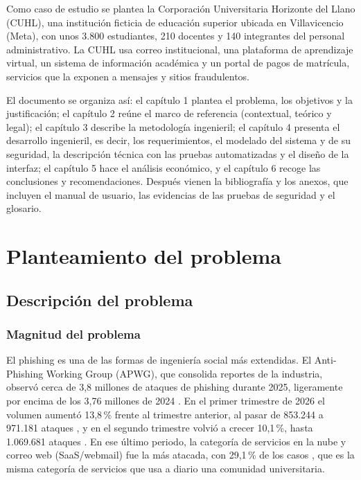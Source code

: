 \documentclass[journal,onecolumn,12pt,draftclsnofoot]{IEEEtran}
\begin{document}
Como caso de estudio se plantea la Corporación Universitaria Horizonte del Llano (CUHL), una institución ficticia de educación superior ubicada en Villavicencio (Meta), con unos 3.800 estudiantes, 210 docentes y 140 integrantes del personal administrativo. La CUHL usa correo institucional, una plataforma de aprendizaje virtual, un sistema de información académica y un portal de pagos de matrícula, servicios que la exponen a mensajes y sitios fraudulentos.

El documento se organiza así: el capítulo 1 plantea el problema, los objetivos y la justificación; el capítulo 2 reúne el marco de referencia (contextual, teórico y legal); el capítulo 3 describe la metodología ingenieril; el capítulo 4 presenta el desarrollo ingenieril, es decir, los requerimientos, el modelado del sistema y de su seguridad, la descripción técnica con las pruebas automatizadas y el diseño de la interfaz; el capítulo 5 hace el análisis económico, y el capítulo 6 recoge las conclusiones y recomendaciones. Después vienen la bibliografía y los anexos, que incluyen el manual de usuario, las evidencias de las pruebas de seguridad y el glosario.

\section{Planteamiento del problema}

\subsection{Descripción del problema}\label{sec:problema}

\subsubsection{Magnitud del problema}

El phishing es una de las formas de ingeniería social más extendidas. El Anti-Phishing Working Group (APWG), que consolida reportes de la industria, observó cerca de 3,8 millones de ataques de phishing durante 2025, ligeramente por encima de los 3,76 millones de 2024 \cite{apwg-q4}. En el primer trimestre de 2026 el volumen aumentó 13,8\,\% frente al trimestre anterior, al pasar de 853.244 a 971.181 ataques \cite{apwg-q1}, y en el segundo trimestre volvió a crecer 10,1\,\%, hasta 1.069.681 ataques \cite{apwg-q2}. En ese último periodo, la categoría de servicios en la nube y correo web (SaaS/webmail) fue la más atacada, con 29,1\,\% de los casos \cite{apwg-q2}, que es la misma categoría de servicios que usa a diario una comunidad universitaria.
\end{document}
